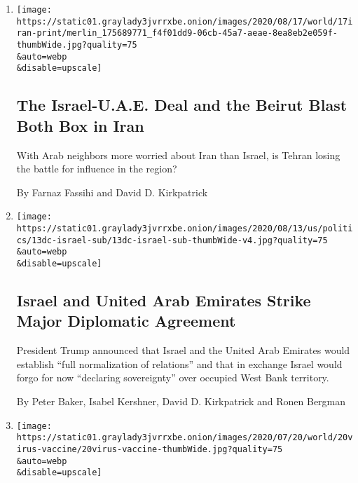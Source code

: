 \begin{enumerate}
\def\labelenumi{\arabic{enumi}.}
\item
  \href{/2020/08/16/world/middleeast/the-israel-uae-deal-and-the-beirut-blast-both-box-in-iran.html}{}

  \texttt{[image: https://static01.graylady3jvrrxbe.onion/images/2020/08/17/world/17iran-print/merlin\_175689771\_f4f01dd9-06cb-45a7-aeae-8ea8eb2e059f-thumbWide.jpg?quality=75\\\&auto=webp\\\&disable=upscale]}

  \hypertarget{the-israel-uae-deal-and-the-beirut-blast-both-box-in-iran}{%
  \subsection{The Israel-U.A.E. Deal and the Beirut Blast Both Box in
  Iran}\label{the-israel-uae-deal-and-the-beirut-blast-both-box-in-iran}}

  With Arab neighbors more worried about Iran than Israel, is Tehran
  losing the battle for influence in the region?

  By Farnaz Fassihi and David D. Kirkpatrick
\item
  \href{/2020/08/13/us/politics/trump-israel-united-arab-emirates-uae.html}{}

  \texttt{[image: https://static01.graylady3jvrrxbe.onion/images/2020/08/13/us/politics/13dc-israel-sub/13dc-israel-sub-thumbWide-v4.jpg?quality=75\\\&auto=webp\\\&disable=upscale]}

  \hypertarget{israel-and-united-arab-emirates-strike-major-diplomatic-agreement}{%
  \subsection{Israel and United Arab Emirates Strike Major Diplomatic
  Agreement}\label{israel-and-united-arab-emirates-strike-major-diplomatic-agreement}}

  President Trump announced that Israel and the United Arab Emirates
  would establish ``full normalization of relations'' and that in
  exchange Israel would forgo for now ``declaring sovereignty'' over
  occupied West Bank territory.

  By Peter Baker, Isabel Kershner, David D. Kirkpatrick and Ronen
  Bergman
\item
  \href{/2020/07/20/world/covid-coronavirus-vaccine.html}{}

  \texttt{[image: https://static01.graylady3jvrrxbe.onion/images/2020/07/20/world/20virus-vaccine/20virus-vaccine-thumbWide.jpg?quality=75\\\&auto=webp\\\&disable=upscale]}


\end{enumerate}
